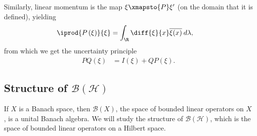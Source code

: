\documentclass[10pt]{mypackage}
\begin{document}
Similarly, linear momentum is the map $\xi\xmapsto{P} \xi'$ (on the domain that it is defined), yielding
\begin{align*}
  \iprod{P\left(\xi\right)}{\xi} &= \int_{\R}^{} \diff{\xi}{x}\overline{\xi(x)}\:d\lambda,
\end{align*}
from which we get the uncertainty principle
\begin{align*}
  PQ\left(\xi\right) &= I\left(\xi\right) + QP\left(\xi\right).
\end{align*}
\subsection{Structure of $\mathcal{B}\left(\mathcal{H}\right)$}%
If $X$ is a Banach space, then $\mathcal{B}\left(X\right)$, the space of bounded linear operators on $X$, is a unital Banach algebra. We will study the structure of $\mathcal{B}\left(\mathcal{H}\right)$, which is the space of bounded linear operators on a Hilbert space.
\end{document}
